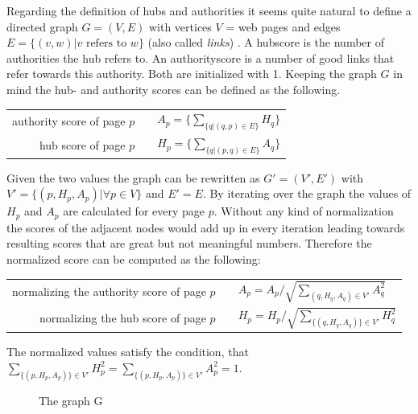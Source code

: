 Regarding the definition of hubs and authorities it seems quite natural to define a directed graph $G=(V,E)$ with vertices $V$ = web pages and edges $E = \{(v,w) | v \textrm{ refers to }w\}$ (also called \emph{links}) .
A hubscore is the number of authorities the hub refers to. An authorityscore is a number of good links that refer towards this authority. Both are initialized with 1.
Keeping the graph $G$ in mind the hub- and authority scores can be defined as the following. \newline
\begin{center}
  \begin{tabular}{ r c l }
    authority score of page $p$ & & $A_p=\{ \sum\nolimits_{\{ q | (q,p) \in E \} } H_q \}$ \\
    hub score of page $p$ & & $H_p = \{ \sum\nolimits_{\{ q | (p,q) \in E \} } A_q \}$ \\
  \end{tabular}
\end{center}
Given the two values the graph can be rewritten as $G'=(V',E')$ with $V'=\{ (p, H_p, A_p)| \forall p\in V\}$ and $E' = E$.
By iterating over the graph the values of $H_p$ and $A_p$ are calculated for every page $p$. Without any kind of normalization the scores of the adjacent nodes would add up in every iteration leading towards resulting scores that are great but not meaningful numbers. Therefore the normalized score can be computed as the following:
\begin{center}
  \begin{tabular}{ r c l }
    normalizing the authority score of page $p$ & & $A_p= A_p/\sqrt{\sum\nolimits_{ (q,H_q,A_q) \in V' } A_q^2}$ \\
    normalizing the hub score of page $p$ & & $H_p = H_p/\sqrt{\sum\nolimits_{\{(q,H_q,A_q) \} \in V'} H_q^2}$ \\
  \end{tabular}
\end{center}
The normalized values satisfy the condition, that $\sum\nolimits_{\{(p,H_p,A_p) \} \in V'} H_p^2 = \sum\nolimits_{\{(p,H_p,A_p) \} \in V'} A_p^2 = 1$.

\begin{figure}
  \centering
  \caption{The graph G}
  \label{graph:HITS - before first interation}
\end{figure}

